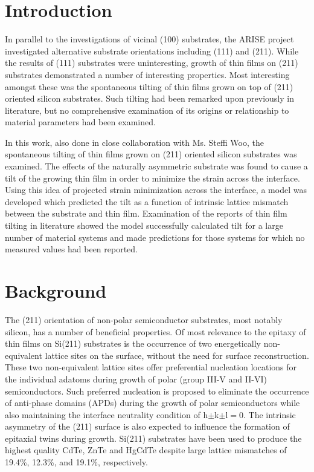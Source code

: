 \section{Introduction}
In parallel to the investigations of vicinal (100) substrates, the ARISE project investigated alternative substrate orientations including (111) and (211). While the results of (111) substrates were uninteresting, growth of thin films on (211) substrates demonstrated a number of interesting properties. Most interesting amongst these was the spontaneous tilting of thin films grown on top of (211) oriented silicon substrates. Such tilting had been remarked upon previously in literature,  but no comprehensive examination of its origins or relationship to material parameters had been examined.

In this work, also done in close collaboration with Ms. Steffi Woo, the spontaneous 
tilting of thin films grown on (211) oriented silicon substrates was examined. The 
effects of the naturally asymmetric substrate was found to cause a tilt of the growing 
thin film in order to minimize the strain across the interface. Using this idea of 
projected strain minimization across the interface, a model was developed which predicted 
the tilt as a function of intrinsic lattice mismatch between the substrate and thin film. 
Examination of the reports of thin film tilting in literature showed the model 
successfully calculated tilt for a large number of material systems and made predictions 
for those systems for which no measured values had been reported.
\section{Background}
The (211) orientation of non-polar semiconductor substrates, most notably silicon, has a number of beneficial properties. Of most relevance to the epitaxy of thin films on Si(211) substrates is the occurrence of two energetically non-equivalent lattice sites on the surface, without the need for surface reconstruction.\cite{Wright1982} These two non-equivalent lattice sites offer preferential nucleation locations for the individual adatoms during growth of polar (group III-V and II-VI) semiconductors. Such preferred nucleation is proposed to eliminate the occurrence of anti-phase domains (APDs) during the growth of polar semiconductors\cite{Wright1982} while also maintaining the interface neutrality condition of h$\pm$k$\pm$l$=$0.\cite{Wright1982} The intrinsic asymmetry of the (211) surface is also expected to influence the formation of epitaxial twins during growth\cite{Devenyi2011}. Si(211) substrates have been used to produce the highest quality CdTe\cite{Zhao2011}, ZnTe\cite{Wang2011a} and HgCdTe\cite{Dhar1997a} despite large lattice mismatches of 19.4\%, 12.3\%, and 19.1\%, respectively. 

